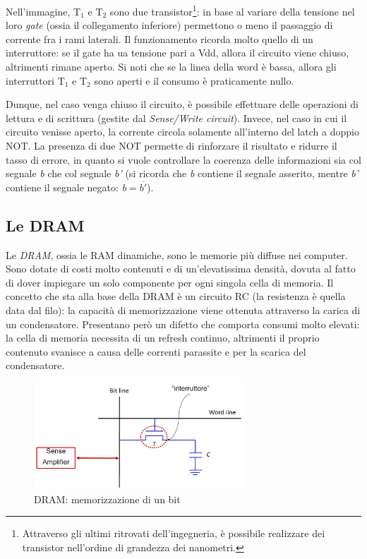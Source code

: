 \documentclass[class=book, crop=false, oneside]{standalone}
\begin{document}
Nell'immagine, \(\textrm{T}_1\) e \(\textrm{T}_2\) sono due transistor\footnote{Attraverso gli ultimi ritrovati dell'ingegneria, è possibile realizzare dei transistor nell'ordine di grandezza dei nanometri.}: in base al variare della tensione nel loro \emph{gate} (ossia il collegamento inferiore) permettono o meno il passaggio di corrente fra i rami laterali. Il funzionamento ricorda molto quello di un interruttore: se il gate ha ua tensione pari a Vdd, allora il circuito viene chiuso, altrimenti rimane aperto. Si noti che se la linea della word è bassa, allora gli interruttori \(\textrm{T}_1\) e \(\textrm{T}_2\) sono aperti e il consumo è praticamente nullo.

Dunque, nel caso venga chiuso il circuito, è possibile effettuare delle operazioni di lettura e di scrittura (gestite dal \emph{Sense/Write circuit}). Invece, nel caso in cui il circuito venisse aperto, la corrente circola solamente all'interno del latch a doppio NOT. La presenza di due NOT permette di rinforzare il risultato e ridurre il tasso di errore, in quanto si vuole controllare la coerenza delle informazioni sia col segnale \emph{b} che col segnale \emph{b'} (si ricorda che \emph{b} contiene il segnale asserito, mentre \emph{b'} contiene il segnale negato: \emph{b}\(=\)\emph{\(\overline{b'}\)}).

\subsection{Le DRAM}
Le \emph{DRAM}, ossia le RAM dinamiche, sono le memorie più diffuse nei computer. Sono dotate di costi molto contenuti e di un'elevatissima densità, dovuta al fatto di dover impiegare un solo componente per ogni singola cella di memoria. Il concetto che sta alla base della DRAM è un circuito RC (la resistenza è quella data dal filo): la capacità di memorizzazione viene ottenuta attraverso la carica di un condensatore. Presentano però un difetto che comporta consumi molto elevati: la cella di memoria necessita di un refresh continuo, altrimenti il proprio contenuto svanisce a causa delle correnti parassite e per la scarica del condensatore.

\begin{figure}[H]
	\centering
	\includegraphics[width=0.7\textwidth,keepaspectratio]{cella_DRAM.png}
	\caption{DRAM: memorizzazione di un bit}
\end{figure}
\end{document}
